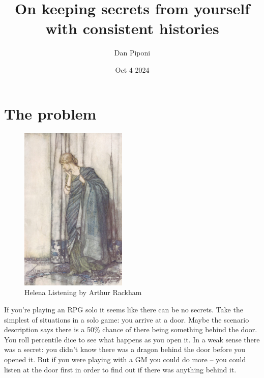 \documentclass[12pt]{article}
\title{On keeping secrets from yourself with consistent histories}
\date{Oct 4 2024}
\author{Dan Piponi}
\begin{document}
\maketitle
\hypertarget{the-problem}{%
\section{The problem}\label{the-problem}}

\begin{figure}
\begin{center}
\includegraphics[width=2in]{media/image1.jpeg}
\caption{Helena Listening by Arthur Rackham}
\end{center}
\end{figure}

If you're playing an RPG solo it seems like there can be no
secrets. Take the simplest of situations in a solo game: you arrive at a
door. Maybe the scenario description says there is a 50\% chance of there being something
behind the door. You roll percentile dice to see what happens as you
open it. In a weak sense there was a secret: you didn't know there
was a dragon behind the door before you opened it. But if you were
playing with a GM you could do more -- you could listen at the door
first in order to find
out if there was anything behind it.
\end{document}
